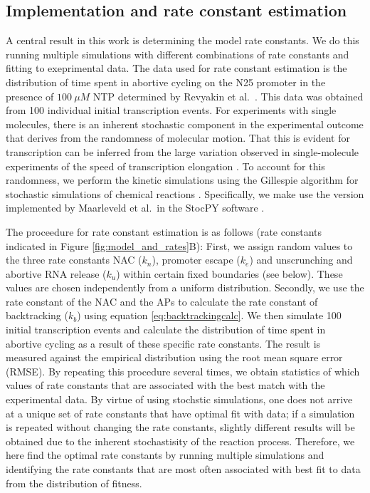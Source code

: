 \subsection{Implementation and rate constant estimation}
A central result in this work is determining the model rate constants. We do
this running multiple simulations with different combinations of rate
constants and fitting to exeprimental data. The data used for rate constant
estimation is the distribution of time spent in abortive cycling on the N25
promoter in the presence of $100\ \mu M$ NTP determined by Revyakin et al.\
\cite{revyakin_abortive_2006}. This data was obtained from 100 individual
initial transcription events. For experiments with single molecules, there is
an inherent stochastic component in the experimental outcome that derives from
the randomness of molecular motion. That this is evident for transcription can
be inferred from the large variation observed in single-molecule experiments
of the speed of transcription elongation \cite{adelman_single_2002,
tolic-norrelykke_diversity_2004}. To account for this randomness, we perform
the kinetic simulations using the Gillespie algorithm for stochastic
simulations of chemical reactions \cite{gillespie_exact_1977}. Specifically,
we make use the version implemented by Maarleveld et al.\ in the StocPY
software \cite{maarleveld_stochpy:_2013}.

The proceedure for rate constant estimation is as follows (rate constants
indicated in Figure \ref{fig:model_and_rates}B): First, we assign random
values to the three rate constants NAC ($k_n$), promoter escape ($k_e$) and
unscrunching and abortive RNA release ($k_u$) within certain fixed boundaries
(see below). These values are chosen independently from a uniform
distribution. Secondly, we use the rate constant of the NAC and the APs to
calculate the rate constant of backtracking ($k_b$) using equation
\ref{eq:backtrackingcalc}. We then simulate 100 initial transcription events
and calculate the distribution of time spent in abortive cycling as a result
of these specific rate constants.  The result is measured against the
empirical distribution \cite{revyakin_abortive_2006} using the root mean
square error (RMSE). By repeating this procedure several times, we obtain
statistics of which values of rate constants that are associated with the best
match with the experimental data. By virtue of using stochstic simulations,
one does not arrive at a unique set of rate constants that have optimal fit
with data; if a simulation is repeated without changing the rate constants,
slightly different results will be obtained due to the inherent stochastisity
of the reaction process. Therefore, we here find the optimal rate constants by
running multiple simulations and identifying the rate constants that are most
often associated with best fit to data from the distribution of fitness.

